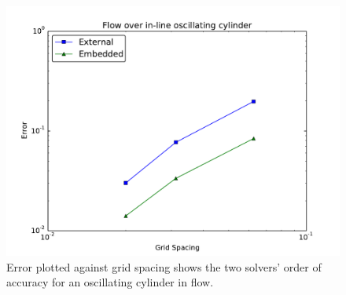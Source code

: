 \begin{figure}[!htb]
	\centering
	\includegraphics[width=0.6\linewidth]{error_oscflow}
	\caption{Error plotted against grid spacing shows the two solvers' order of accuracy for an oscillating cylinder in flow.}
	\label{fig:oscerror}
\end{figure}

